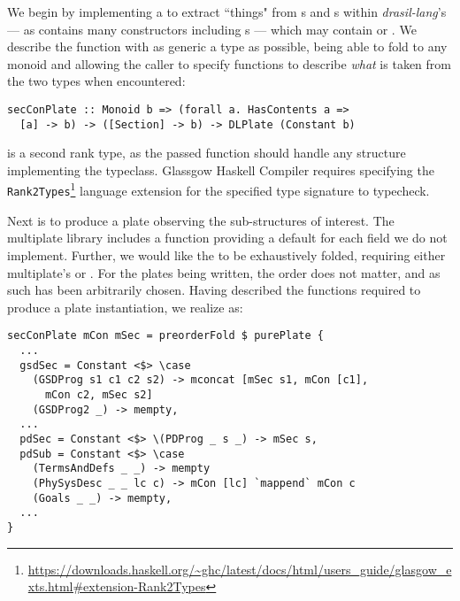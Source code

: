 We begin by implementing a  to extract ``things" from s and s within \textit{drasil-lang}'s  --- as  contains many constructors including s --- which may contain  or . We describe the function with as generic a type as possible, being able to fold \clearpage to any monoid and allowing the caller to specify functions to describe \textit{what} is taken from the two  types when encountered:

\begin{tcolorbox}
\begin{verbatim}
secConPlate :: Monoid b => (forall a. HasContents a =>
  [a] -> b) -> ([Section] -> b) -> DLPlate (Constant b)
\end{verbatim}
\end{tcolorbox}

 is a second rank type, as the passed function should handle any structure implementing the  typeclass. Glassgow Haskell Compiler requires specifying the \texttt{Rank2Types}\footnote{\url{https://downloads.haskell.org/~ghc/latest/docs/html/users_guide/glasgow_exts.html\#extension-Rank2Types}} language extension for the specified type signature to typecheck. 

Next is to produce a plate observing the sub-structures of interest. The multiplate library includes a function  providing a  default for each field we do not implement. Further, we would like the  to be exhaustively folded, requiring either multiplate's  or . For the plates being written, the order does not matter, and as such  has been arbitrarily chosen. Having described the functions required to produce a plate instantiation, we realize  as:

\begin{tcolorbox}[breakable, toprule at break=0pt, bottomrule at break=0pt]
\begin{verbatim}
secConPlate mCon mSec = preorderFold $ purePlate {
  ...
  gsdSec = Constant <$> \case
    (GSDProg s1 c1 c2 s2) -> mconcat [mSec s1, mCon [c1],
      mCon c2, mSec s2]
    (GSDProg2 _) -> mempty,
  ...
  pdSec = Constant <$> \(PDProg _ s _) -> mSec s,
  pdSub = Constant <$> \case
    (TermsAndDefs _ _) -> mempty
    (PhySysDesc _ _ lc c) -> mCon [lc] `mappend` mCon c
    (Goals _ _) -> mempty,
  ...
}
\end{verbatim}
\end{tcolorbox}

